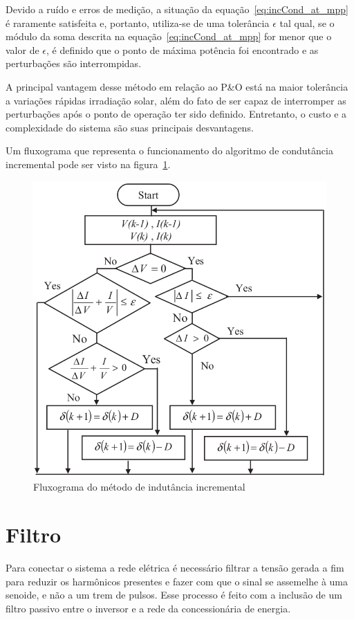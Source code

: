 \documentclass[
	12pt,				%
	openany,
	onseside,
	a4paper,			%
	english,			%
	french,				%
	spanish,			%
	brazil,				%
	]{abntex2}
\begin{document}
Devido a ruído e erros de medição, a situação da equação~\ref{eq:incCond_at_mpp} é raramente satisfeita e, portanto, utiliza-se de uma tolerância $\epsilon$ tal qual, se o módulo da soma descrita na equação~\ref{eq:incCond_at_mpp} for menor que o valor de $\epsilon$, é definido que o ponto de máxima potência foi encontrado e as perturbações são interrompidas\cite{Talha_MPPT}.

A principal vantagem desse método em relação ao P\&O está na maior tolerância a variações rápidas irradiação solar, além do fato de ser capaz de interromper as perturbações após o ponto de operação ter sido definido. Entretanto, o custo e a complexidade do sistema são suas principais desvantagens\cite{MPPT_P&O_IC}.

Um fluxograma que representa o funcionamento do algoritmo de condutância incremental pode ser visto na figura~\ref{fig:IncCond_Flux}.

\begin{figure}[H]
	\begin{center}
		\includegraphics[width=0.65 \linewidth]{incCond_flow}
		\caption{Fluxograma do método de indutância incremental \cite{Talha_MPPT}}
		\label{fig:IncCond_Flux}
	\end{center}
\end{figure}

\section{Filtro}

Para conectar o sistema a rede elétrica é necessário filtrar a tensão gerada a fim para reduzir os harmônicos presentes e fazer com que o sinal se assemelhe à uma senoide, e não a um trem de pulsos. Esse processo é feito com a inclusão de um filtro passivo entre o inversor e a rede da concessionária de energia.
\end{document}
